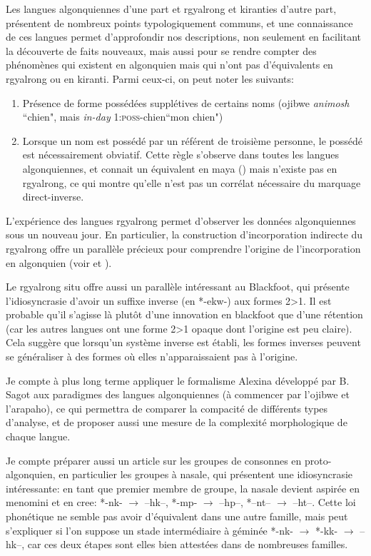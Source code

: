 \documentclass[oldfontcommands,oneside,a4paper,11pt]{memoir}
\begin{document}
Les langues algonquiennes d'une part et rgyalrong et kiranties d'autre part, présentent de nombreux points typologiquement communs, et une connaissance de ces langues permet d'approfondir nos descriptions, non seulement en facilitant la découverte de faits nouveaux, mais aussi pour se rendre compter des phénomènes qui existent en algonquien mais qui n'ont pas d'équivalents en rgyalrong ou en kiranti. Parmi ceux-ci, on peut noter les suivants:

\begin{enumerate}
\item Présence de forme possédées supplétives de certains noms (ojibwe \textit{animosh} ``chien", mais \textit{in-day} \textsc{1:poss}-chien``mon chien")
\item Lorsque un nom est possédé par un référent de troisième personne, le possédé est nécessairement obviatif. Cette règle s'observe dans toutes les langues algonquiennes, et connait un équivalent en maya (\citealt{aissen97obviation}) mais n'existe pas en rgyalrong, ce qui montre qu'elle n'est pas un corrélat nécessaire du marquage direct-inverse.

\end{enumerate}


L'expérience des langues rgyalrong permet d'observer les données algonquiennes sous un nouveau jour. En particulier, la construction d'incorporation indirecte du rgyalrong offre un parallèle précieux pour comprendre l'origine de l'incorporation en algonquien (voir \citealt{jacques12incorp} et \citealt{garrett04stem.structure}). 

Le rgyalrong situ offre aussi un parallèle intéressant au Blackfoot, qui présente l'idiosyncrasie d'avoir un suffixe inverse (en *-ekw-) aux formes 2>1. Il est probable qu'il s'agisse là plutôt d'une innovation en blackfoot que d'une rétention (car les autres langues ont une forme 2>1 opaque dont l'origine est peu claire). Cela suggère que lorsqu'un système inverse est établi, les formes inverses peuvent se généraliser à des formes où elles n'apparaissaient pas à l'origine.

Je compte à plus long  terme  appliquer le formalisme Alexina développé par B. Sagot aux paradigmes des langues algonquiennes (à commencer par l'ojibwe et l'arapaho), ce qui permettra de comparer la compacité de différents types d'analyse, et de proposer aussi une mesure de la complexité morphologique de chaque langue.

Je compte préparer aussi un article sur les groupes de consonnes en proto-algonquien, en particulier les groupes à nasale, qui présentent une idiosyncrasie intéressante: en tant que premier membre de groupe, la nasale devient aspirée en menomini et en cree: *-nk- $\rightarrow$ --hk--, *-mp- $\rightarrow$ --hp--, *--nt-- $\rightarrow$ --ht--. Cette loi phonétique ne semble pas avoir d'équivalent dans une autre famille, mais peut s'expliquer si l'on suppose un stade intermédiaire à géminée *-nk- $\rightarrow$ *-kk- $\rightarrow$ --hk--, car ces deux étapes sont elles bien attestées dans de nombreuses familles.
\end{document}
